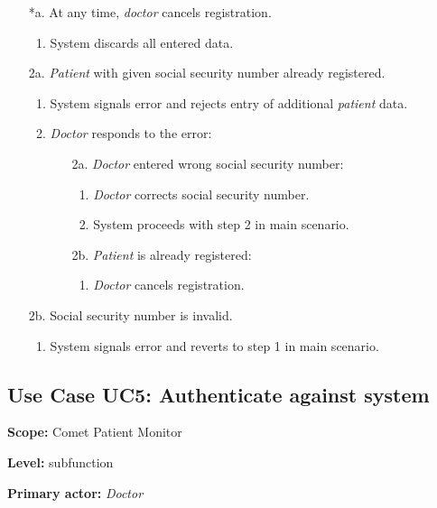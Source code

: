 \documentclass[fontsize=12pt,
               paper=a4,
               twoside=false,
               parskip=half,
               ]{scrartcl}
\begin{document}
\begin{itemize}[leftmargin=3em]
	\item[*a.] At any time, \emph{doctor} cancels registration.
	\begin{enumerate}
		\item System discards all entered data.
	\end{enumerate}
	\item[2a.] \emph{Patient} with given social security number already registered.
	\begin{enumerate}
		\item System signals error and rejects entry of additional \emph{patient} data.
		\item \emph{Doctor} responds to the error:
		\begin{itemize}
			\item[2a.] \emph{Doctor} entered wrong social security number:
			\begin{enumerate}[label=\arabic*.]
				\item \emph{Doctor} corrects social security number.
				\item System proceeds with step 2 in main scenario.
			\end{enumerate}
			\item[2b.] \emph{Patient} is already registered:
			\begin{enumerate}[label=\arabic*.]
				\item \emph{Doctor} cancels registration.
			\end{enumerate}
		\end{itemize}
	\end{enumerate}
	\item[2b.] Social security number is invalid.
	\begin{enumerate}
		\item System signals error and reverts to step 1 in main scenario.
	\end{enumerate}
\end{itemize}


\subsection{Use Case UC5: Authenticate against system}

\textbf{\textsf{Scope:}} Comet Patient Monitor

\textbf{\textsf{Level:}} subfunction

\textbf{\textsf{Primary actor:}} \emph{Doctor}
\end{document}
